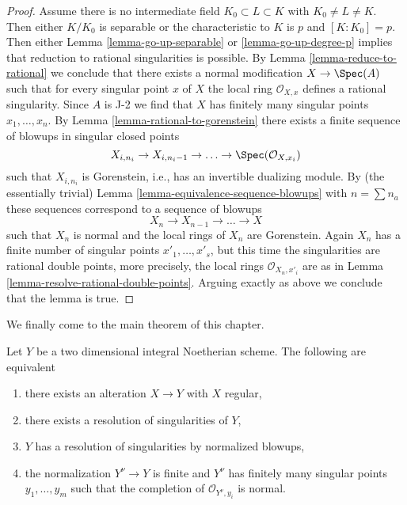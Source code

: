 \begin{proof}
\medskip\noindent
Assume there is no intermediate field $K_0 \subset L \subset K$
with $K_0 \not = L \not = K$. Then either $K/K_0$ is separable
or the characteristic to $K$ is $p$ and $[K : K_0] = p$.
Then either Lemma \ref{lemma-go-up-separable} or \ref{lemma-go-up-degree-p}
implies that reduction to rational singularities is possible.
By Lemma \ref{lemma-reduce-to-rational} we conclude that there exists a
normal modification $X \to \Spec(A)$ such that for
every singular point $x$ of $X$ the local ring $\mathcal{O}_{X, x}$
defines a rational singularity. Since $A$ is J-2 we find that $X$ has
finitely many singular points $x_1, \ldots, x_n$.
By Lemma \ref{lemma-rational-to-gorenstein}
there exists a finite sequence of blowups in singular closed points
$$
X_{i, n_i} \to X_{i, n_i - 1} \to \ldots \to \Spec(\mathcal{O}_{X, x_i})
$$
such that $X_{i, n_i}$ is Gorenstein, i.e., has an
invertible dualizing module. By (the essentially trivial)
Lemma \ref{lemma-equivalence-sequence-blowups}
with $n = \sum n_a$ these sequences correspond to a sequence of
blowups
$$
X_n \to X_{n - 1} \to \ldots \to X
$$
such that $X_n$ is normal and the local rings of $X_n$ are Gorenstein.
Again $X_n$ has a finite number of singular points
$x'_1, \ldots, x'_s$, but this time the singularities are
rational double points, more precisely, the local rings
$\mathcal{O}_{X_n, x'_i}$ are as in
Lemma \ref{lemma-resolve-rational-double-points}.
Arguing exactly as above we conclude that the lemma is true.
\end{proof}

\noindent
We finally come to the main theorem of this chapter.

\begin{theorem}[Lipman]
\label{theorem-resolve}
\begin{reference}
\cite[Theorem on page 151]{Lipman}
\end{reference}
Let $Y$ be a two dimensional integral Noetherian scheme. The following are
equivalent
\begin{enumerate}
\item there exists an alteration $X \to Y$ with $X$ regular,
\item there exists a resolution of singularities of $Y$,
\item $Y$ has a resolution of singularities by normalized blowups,
\item the normalization $Y^\nu \to Y$ is finite and $Y^\nu$ has
finitely many singular points $y_1, \ldots, y_m$ such that the
completion of $\mathcal{O}_{Y^\nu, y_i}$ is normal.
\end{enumerate}
\end{theorem}

